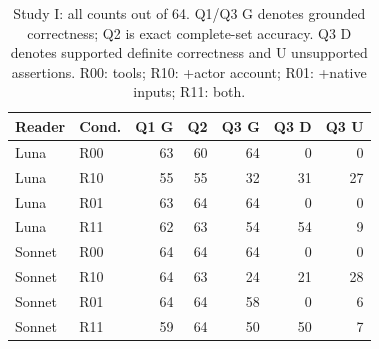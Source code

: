\begin{table}[t]
\centering
\caption{Study I: all counts out of 64. Q1/Q3 G denotes grounded correctness; Q2 is exact complete-set accuracy. Q3 D denotes supported definite correctness and U unsupported assertions. R00: tools; R10: +actor account; R01: +native inputs; R11: both.}
\label{tab:study1}
\setlength{\tabcolsep}{4pt}
\begin{tabular*}{\textwidth}{@{\extracolsep{\fill}}llrrrrr@{}}
\toprule
Reader & Cond. & Q1 G & Q2 & Q3 G & Q3 D & Q3 U \\
\midrule
Luna & R00 & 63 & 60 & 64 & 0 & 0 \\
Luna & R10 & 55 & 55 & 32 & 31 & 27 \\
Luna & R01 & 63 & 64 & 64 & 0 & 0 \\
Luna & R11 & 62 & 63 & 54 & 54 & 9 \\
Sonnet & R00 & 64 & 64 & 64 & 0 & 0 \\
Sonnet & R10 & 64 & 63 & 24 & 21 & 28 \\
Sonnet & R01 & 64 & 64 & 58 & 0 & 6 \\
Sonnet & R11 & 59 & 64 & 50 & 50 & 7 \\
\bottomrule
\end{tabular*}
\end{table}
